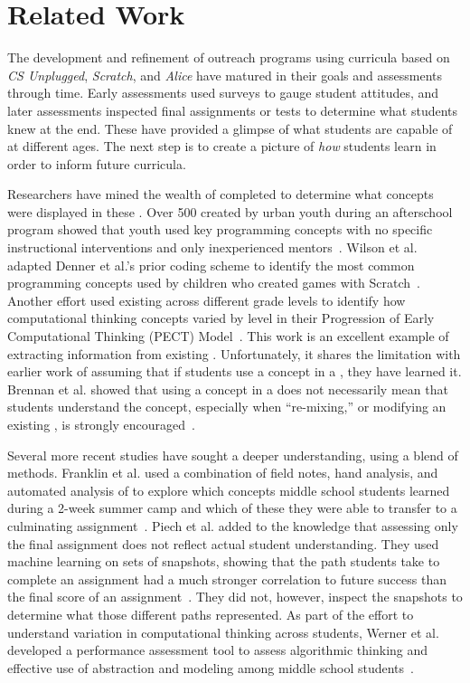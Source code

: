 \section{Related Work}
The development and refinement of outreach programs using curricula based on
\emph{CS Unplugged}, \emph{Scratch}, and \emph{Alice} have matured in their
goals and assessments through time. Early assessments used surveys to gauge
student attitudes, and later assessments inspected final assignments or tests
to determine what students knew at the end. These have provided a glimpse of
what students are capable of at different ages. The next step is to create a
picture of \emph{how} students learn in order to inform future curricula.

Researchers have mined the wealth of completed  to determine what
concepts were displayed in these . Over 500  created by
urban youth during an afterschool program showed that youth used key
programming concepts with no specific instructional interventions and only
inexperienced mentors~\cite{Maloney:2008:PCU:1352135.1352260}. Wilson et
al. adapted Denner et al.'s prior coding scheme to identify the most common
programming concepts used by children who created games with
Scratch~\cite{Denner:2012:CGC:2072695.2073050, wilson12}. Another effort used
existing  across different grade levels to identify how
computational thinking concepts varied by level in their Progression of Early
Computational Thinking (PECT)
Model~\cite{Seiter:2013:MLP:2493394.2493403}. This work is an excellent example
of extracting information from existing . Unfortunately, it shares
the limitation with earlier work of assuming that if students use a concept in
a \sprogram{}, they have learned it. Brennan et al. showed that using a concept
in a \sprogram{} does not necessarily mean that students understand the
concept, especially when ``re-mixing,'' or modifying an existing \sprogram{},
is strongly encouraged~\cite{brennan12}.

Several more recent studies have sought a deeper understanding, using a blend
of methods. Franklin et al. used a combination of field notes, hand analysis,
and automated analysis of  to explore which concepts middle school
students learned during a 2-week summer camp and which of these they were able
to transfer to a culminating assignment~\cite{Boe:2013:HLS:2445196.2445265,
  Franklin:2013:SBO}. Piech et al. added to the knowledge that assessing only
the final assignment does not reflect actual student understanding. They used
machine learning on sets of snapshots, showing that the path students take to
complete an assignment had a much stronger correlation to future success than
the final score of an assignment~\cite{Piech:2012:MSL:2157136.2157182}. They
did not, however, inspect the snapshots to determine what those different paths
represented. As part of the effort to understand variation in computational
thinking across students, Werner et al. developed a performance assessment tool
to assess algorithmic thinking and effective use of abstraction and modeling
among middle school students~\cite{Werner:2012:FPA:2157136.2157200}.

